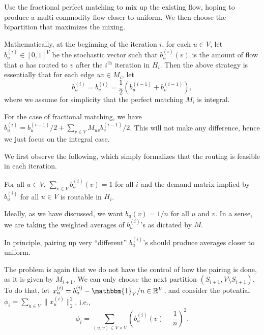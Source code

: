 \begin{intuition}
	Use the fractional perfect matching to mix up the existing flow, hoping to produce a multi-commodity flow closer to uniform. We then choose the bipartition that maximizes the mixing.
\end{intuition}

Mathematically, at the beginning of the iteration \(i\), for each \(u \in V\), let \(b_u^{(i)} \in [0, 1]^V\) be the stochastic vector such that \(b_u^{(i)}(v)\) is the amount of flow that \(u\) has routed to \(v\) after the \(i^{\text{th} }\) iteration in \(H_i\). Then the above strategy is essentially that for each edge \(uv \in M_i\), let
\[
	b_u^{(i)}
	= b_v^{(i)}
	= \frac{1}{2} (b_u^{(i-1)} + b_v^{(i-1)}),
\]
where we assume for simplicity that the perfect matching \(M_i\) is integral.

\begin{note}
	For the case of fractional matching, we have \(b_u^{(i)} = b_u^{(i-1)} / 2 + \sum_{v \in V} M_{uv} b_v^{(i-1)} / 2\). This will not make any difference, hence we just focus on the integral case.
\end{note}

We first observe the following, which simply formalizes that the routing is feasible in each iteration.

\begin{claim}
	For all \(u \in V\), \(\sum_{v \in V} b_u^{(i)}(v) = 1\) for all \(i\) and the demand matrix implied by \(b_u^{(i)}\) for all \(u \in V\) is routable in \(H_i\).
\end{claim}

Ideally, as we have discussed, we want \(b_u(v) = 1 / n\) for all \(u\) and \(v\). In a sense, we are taking the weighted averages of \(b_u^{(i)}\)'s as dictated by \(M\).

\begin{intuition}
	In principle, pairing up very ``different'' \(b_u^{(i)}\)'s should produce averages closer to uniform.
\end{intuition}

The problem is again that we do not have the control of how the pairing is done, as it is given by \(M_{i+1}\). We can only choose the next partition \((S_{i+1}, V\setminus S_{i+1})\). To do that, let \(x_u^{(i)} = b_u^{(i)} - \mathbbm{1}_{V} / n \in \mathbb{R} ^V\), and consider the potential \(\phi _i = \sum_{u \in V} \lVert x_u^{(i)} \rVert _2^2\), i.e.,
\[
	\phi _i
	= \sum_{(u, v) \in V \times V} \left( b_u^{(i)}(v) - \frac{1}{n} \right) ^2.
\]


